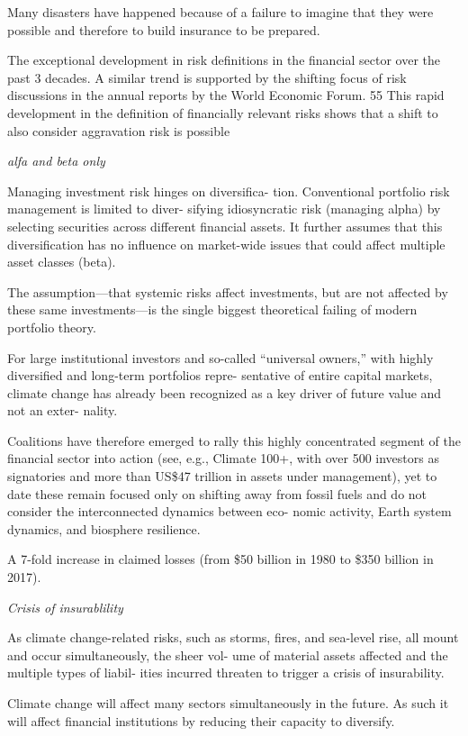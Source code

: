 \documentclass[
]{book}
\begin{document}
Many disasters have happened because of a failure to imagine
that they were possible and therefore to build insurance to be
prepared.

The exceptional development in risk definitions in the financial
sector over the past 3 decades. A similar
trend is supported by the shifting focus of risk discussions in
the annual reports by the World Economic Forum. 55 This rapid
development in the definition of financially relevant risks shows
that a shift to also consider aggravation risk is possible

\emph{alfa and beta only}

Managing investment risk hinges on diversifica-
tion. Conventional portfolio risk management is limited to diver-
sifying idiosyncratic risk (managing alpha) by selecting securities
across different financial assets. It further assumes that this
diversification has no influence on market-wide issues that could
affect multiple asset classes (beta).

The assumption---that systemic risks affect
investments, but are not affected by these same investments---is
the single biggest theoretical failing of modern portfolio theory.

For large institutional investors and so-called ``universal
owners,'' with highly diversified and long-term portfolios repre-
sentative of entire capital markets, climate change has already
been recognized as a key driver of future value and not an exter-
nality.

Coalitions have therefore emerged to rally this highly
concentrated segment of the financial sector into action (see,
e.g., Climate 100+, with over 500 investors as signatories and
more than US\$47 trillion in assets under management), yet to
date these remain focused only on shifting away from fossil fuels
and do not consider the interconnected dynamics between eco-
nomic activity, Earth system dynamics, and biosphere resilience.

A 7-fold increase in claimed losses (from \$50 billion in 1980 to \$350 billion in 2017).

\emph{Crisis of insurablility}

As climate change-related risks, such as storms, fires, and
sea-level rise, all mount and occur simultaneously, the sheer vol-
ume of material assets affected and the multiple types of liabil-
ities incurred threaten to trigger a crisis of insurability.

Climate change will affect
many sectors simultaneously in the future. As such it will affect
financial institutions by reducing their capacity to diversify.
\end{document}
